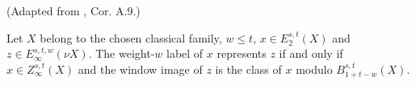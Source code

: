 \begin{theorem}
\label{frontier:Literature:322d0d20f79e}
(Adapted from \cite{BHS}, Cor. A.9.)\par{}

Let $X$ belong to the chosen classical family, $w\le t$, $x\in E_2^{s,t}(X)$ and $z\in E_\infty^{s,t,w}(\nu X)$. The weight-$w$ label of $x$ represents $z$ if and only if $x\in Z_\infty^{s,t}(X)$ and the window image of $z$ is the class of $x$ modulo $B_{1+t-w}^{s,t}(X)$.
\end{theorem}

